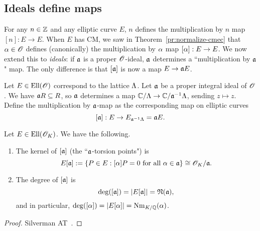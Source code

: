 \subsection{Ideals define maps}
For any $n\in \mathbb{Z}$ and any elliptic curve $E$, $n$ defines the multiplication by $n$ map $[n]:E\to E$. When $E$ has CM, we saw in Theorem~\ref{pr:normalize-cmec} that $\alpha\in \mathscr{O}$ defines (canonically) the multiplication by $\alpha$ map $[\alpha]:E\to E$. We now extend this to {\it ideals}: if $\mathfrak{a}$ is a proper $\mathscr{O}$-ideal, $\mathfrak{a}$ determines a ``multiplication by $\mathfrak{a}$" map. The only difference is that $[\mathfrak{a}]$ is now a map $E\to \mathfrak{a} E$.
\begin{df}
Let $E\in \text{Ell}(\mathscr{O})$ correspond to the lattice $\Lambda$. Let $\mathfrak{a}$ be a proper integral ideal of $\mathscr{O}$. We have $\mathfrak{a} R\subseteq R$, so $\mathfrak{a}$ determines a map $\mathbb{C}/\Lambda\to \mathbb{C}/\mathfrak{a}^{-1}\Lambda$, sending $z\mapsto z$. 
Define the multiplication by $\mathfrak{a}$-map as the corresponding map on elliptic curves 
\[[\mathfrak{a}]:E\to E_{\mathfrak{a}^{-1}\Lambda}=\mathfrak{a} E.\]
\end{df}
\begin{pr}
Let $E\in \text{Ell}(\mathscr{O}_K)$. We have the following.
\begin{enumerate}
\item
The kernel of $[\mathfrak{a}]$ (the ``$\mathfrak{a}$-torsion points") is
\[
E[\mathfrak{a}]:=\left\{{P\in E}:{[\alpha]P=0\text{ for all }\alpha\in \mathfrak{a}}\right\}\cong \mathscr{O}_K/\mathfrak{a}.
\]
\item
The degree of $[\mathfrak{a}]$ is
\[\deg([\mathfrak{a}])=|E[\mathfrak{a}]|=\mathfrak{N}(\mathfrak{a}),\]
and in particular, $\deg([\alpha])=|E[\alpha]|=\operatorname{Nm}_{K/\mathbb{Q}}(\alpha)$.
\end{enumerate}
\end{pr}
\begin{proof}
Silverman AT~\cite[pg. 102-3]{Si94}.
\end{proof}
